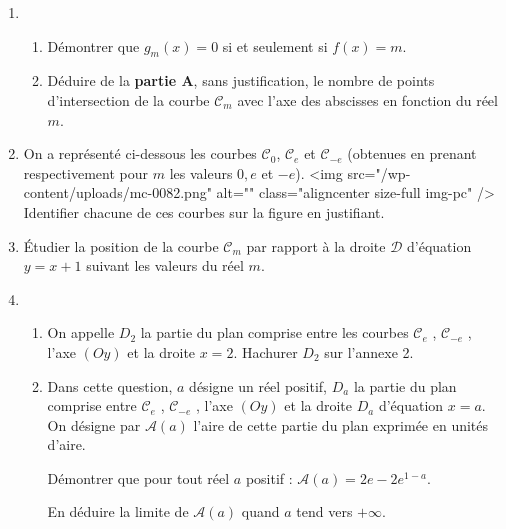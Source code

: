 \begin{enumerate}
     \item
     \begin{enumerate}[label=\alph*.]
          \item
          Démontrer que $g_{m}\left(x\right)=0$ si et seulement si $f\left(x\right)=m$.
          \item
     Déduire de la \textbf{partie A}, sans justification, le nombre de points d'intersection de la courbe $\mathscr C_{m}$ avec l'axe des abscisses en fonction du réel $m$.\end{enumerate}
     \item
     On a représenté ci-dessous les courbes $\mathscr C_{0}$, $\mathscr C_{e}$ et $\mathscr C_{-e}$ (obtenues en prenant respectivement pour $m$ les valeurs $0, e$ et $-e$).
     <img src="/wp-content/uploads/mc-0082.png" alt="" class="aligncenter size-full  img-pc" />
     Identifier chacune de ces courbes sur la figure en justifiant.
     \item
     Étudier la position de la courbe $\mathscr C_{m}$ par rapport à la droite $\mathscr D$ d'équation $y=x+1$ suivant les valeurs du réel $m$.
     \item
     \begin{enumerate}[label=\alph*.]
          \item
          On appelle $D_{2}$ la partie du plan comprise entre les courbes $\mathscr C_{e}$ , $\mathscr C_{-e}$ , l'axe $\left(Oy\right)$ et la droite $x=2$. Hachurer $D_{2}$ sur l'annexe 2.
          \item
          Dans cette question, $a$ désigne un réel positif, $D_{a}$ la partie du plan comprise entre $\mathscr C_{e}$ , $\mathscr C_{-e}$ , l'axe $\left(Oy\right)$ et la droite $D_{a}$ d'équation $x=a$. On désigne par $\mathscr A\left(a\right)$ l'aire de cette partie du plan exprimée en unités d'aire.
          \par
          Démontrer que pour tout réel $a$ positif : $\mathscr A\left(a\right)=2e-2e^{1-a}$.
          \par
     En déduire la limite de $\mathscr A\left(a\right)$ quand $a$ tend vers $+ \infty $.\end{enumerate}
\end{enumerate}
